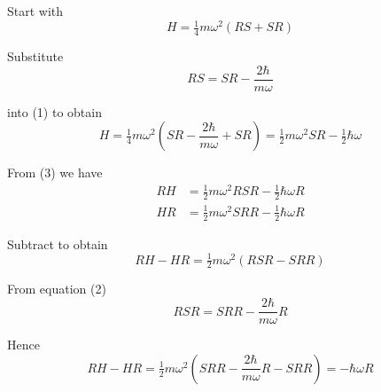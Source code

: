 


\bigskip
Start with
\begin{equation*}
H=\tfrac{1}{4}m\omega^2(RS+SR)
\tag{1}
\end{equation*}

Substitute
\begin{equation*}
RS=SR-\frac{2\hbar}{m\omega}
\tag{2}
\end{equation*}

into (1) to obtain
\begin{equation*}
H=\tfrac{1}{4}m\omega^2\left(SR-\frac{2\hbar}{m\omega}+SR\right)
=\tfrac{1}{2}m\omega^2SR-\tfrac{1}{2}\hbar\omega
\tag{3}
\end{equation*}

From (3) we have
\begin{align*}
RH&=\tfrac{1}{2}m\omega^2RSR-\tfrac{1}{2}\hbar\omega R
\\
HR&=\tfrac{1}{2}m\omega^2SRR-\tfrac{1}{2}\hbar\omega R
\end{align*}

Subtract to obtain
\begin{equation*}
RH-HR=\tfrac{1}{2}m\omega^2(RSR-SRR)
\end{equation*}

From equation (2)
\begin{equation*}
RSR=SRR-\frac{2\hbar}{m\omega}R
\end{equation*}

Hence
\begin{equation*}
RH-HR=\tfrac{1}{2}m\omega^2\left(SRR-\frac{2\hbar}{m\omega}R-SRR\right)=-\hbar\omega R\tag{4}
\end{equation*}

